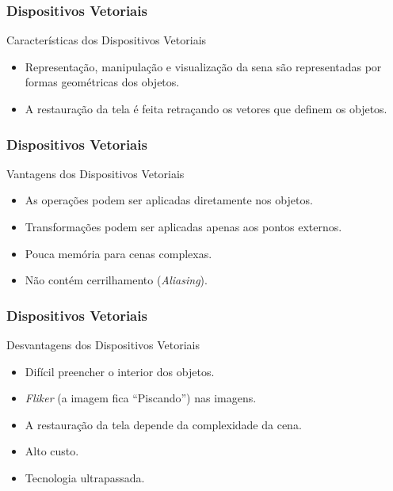 \documentclass{beamer}
\begin{document}

\begin{frame}
\frametitle{Dispositivos Vetoriais}
	
	\begin{block}{Características dos Dispositivos Vetoriais}
		\begin{itemize}
			\item Representação, manipulação e visualização da sena são representadas por formas geométricas dos objetos.
			\item A restauração da tela é feita retraçando os vetores que definem os objetos.
		\end{itemize}
	\end{block}

\end{frame}


\begin{frame}
\frametitle{Dispositivos Vetoriais}
	
	\begin{block}{Vantagens dos Dispositivos Vetoriais}
		\begin{itemize}
			\item As operações podem ser aplicadas diretamente nos objetos.
			\item Transformações podem ser aplicadas apenas aos pontos externos.
			\item Pouca memória para cenas complexas.
			\item Não contém cerrilhamento (\textit{Aliasing}).
		\end{itemize}
	\end{block}

\end{frame}


\begin{frame}
\frametitle{Dispositivos Vetoriais}
	
	\begin{block}{Desvantagens dos Dispositivos Vetoriais}
		\begin{itemize}
			\item Difícil preencher o interior dos objetos.
			\item \textit{Fliker} (a imagem fica ``Piscando'') nas imagens.
			\item A restauração da tela depende da complexidade da cena.
			\item Alto custo.
			\item Tecnologia ultrapassada.
		\end{itemize}
	\end{block}

\end{frame}
\end{document}
